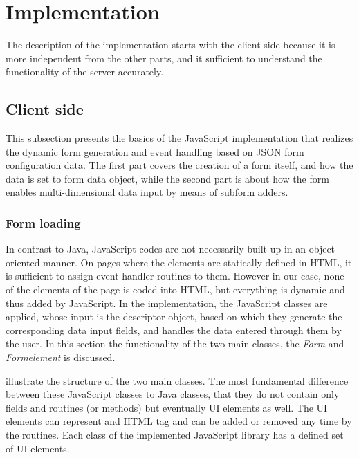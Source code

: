 
\newpage
\section{Implementation} \label{52}

The description of the implementation starts with the client side because it is more independent from the other parts, and it sufficient to understand the functionality of the server accurately.

\subsection{Client side}

This subsection presents the basics of the JavaScript implementation that realizes the dynamic form generation and event handling based on JSON form configuration data. The first part covers the creation of a form itself, and how the data is set to form data object, while the second part is about how the form enables multi-dimensional data input by means of subform adders.
 
\subsubsection{Form loading}

In contrast to Java, JavaScript codes are not necessarily built up in an object-oriented manner. On pages where the elements are statically defined in HTML, it is sufficient to assign event handler routines to them. However in our case, none of the elements of the page is coded into HTML, but everything is dynamic and thus added by JavaScript. In the implementation, the JavaScript classes are applied, whose input is the descriptor object, based on which they generate the corresponding data input fields, and handles the data entered through them by the user. In this section the functionality of the two main classes, the \textit{Form} and \textit{Formelement} is discussed. 


 illustrate the structure of the two main classes. The most fundamental difference between these JavaScript classes to Java classes, that they do not contain only fields and routines (or methods) but eventually UI elements as well. The UI elements can represent and HTML tag and can be added or removed any time by the routines. Each class of the implemented JavaScript library has a defined set of UI elements. 

